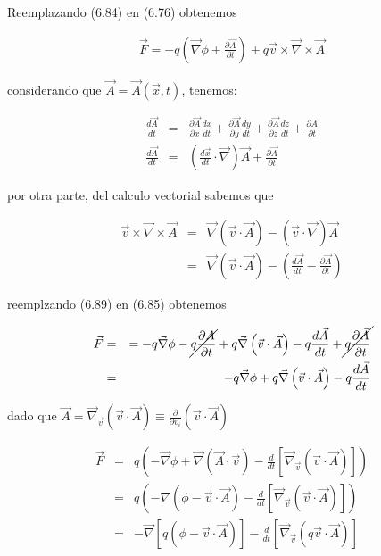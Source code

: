 \documentclass[12pt]{report}
\begin{document}
Reemplazando (6.84) en (6.76) obtenemos

\begin{eqnarray}
\vec{F}= -q \left( \vec{\nabla} \phi + \frac{\partial \vec{A}}{\partial t} \right) + q\vec{v} \times \vec{\nabla} \times \vec{A}
\end{eqnarray}


considerando que $\vec{A}=\vec{A}(\vec{x},t)$, tenemos:

\begin{eqnarray}
\frac{d\vec{A}}{dt}&=& \frac{\partial \vec{A}}{\partial x}\frac{dx}{dt} + \frac{\partial \vec{A}}{\partial y}\frac{dy}{dt} + \frac{\partial \vec{A}}{\partial z}\frac{dz}{dt} + \frac{\partial A}{\partial t} \\
 \frac{d\vec{A}}{dt}&=& \left( \frac{d\vec{x}}{dt} \cdot \vec{\nabla} \right) \vec{A} + \frac{\partial \vec{A}}{\partial t}
\end{eqnarray}



por otra parte, del calculo vectorial sabemos que 

\begin{eqnarray}
\vec{v} \times \vec{\nabla} \times \vec{A} &=& \vec{\nabla} \left(\vec{v} \cdot \vec{A} \right)- \left(\vec{v} \cdot \vec{\nabla}\right) \vec{A} \\
&=& \vec{\nabla} \left(\vec{v} \cdot \vec{A}\right) - \left( \frac{d\vec{A}}{dt}-\frac{\partial \vec{A}}{\partial t} \right)
\end{eqnarray}

reemplzando (6.89) en (6.85) obtenemos

\begin{eqnarray}
\vec{F} &=&= -q\vec{\nabla}\phi - \cancel{q\frac{\partial A}{\partial t}} + q\vec{\nabla} \left( \vec{v} \cdot \vec{A} \right) - q\frac{d\vec{A}}{dt} + \cancel{q\frac{\partial \vec{A}}{\partial t}} \\
&=&  -q\vec{\nabla}\phi  + q\vec{\nabla} \left(\vec{v} \cdot \vec{A} \right) - q\frac{d\vec{A}}{dt} 
\end{eqnarray}


dado que $ \vec{A}=\displaystyle \vec{\nabla}_{\vec{v}} \left( \vec{v} \cdot \vec{A} \right) \equiv \frac{\partial}{\partial v_i} \left( \vec{v} \cdot \vec{A} \right)$


\begin{eqnarray}
\vec{F}&=&q\left(- \vec{\nabla}\phi +\vec{\nabla} \left( \vec{A} \cdot \vec{v} \right) - \frac{d}{dt} \left[ \vec{\nabla}_{\vec{v}} \left( \vec{v} \cdot \vec{A} \right)  \right] \right) \\
&=& q \left( -\nabla \left( \phi-\vec{v} \cdot \vec{A} \right) - \frac{d}{dt} \left[ \vec{\nabla}_{\vec{v}} \left( \vec{v} \cdot \vec{A} \right) \right] \right) \\
&=& -\vec{\nabla} \left[ q\left( \phi - \vec{v} \cdot \vec{A}  \right) \right] - \frac{d}{dt} \left[ \vec{\nabla}_{\vec{v}} \left( q\vec{v} \cdot \vec{A} \right) \right]
\end{eqnarray}
\end{document}
